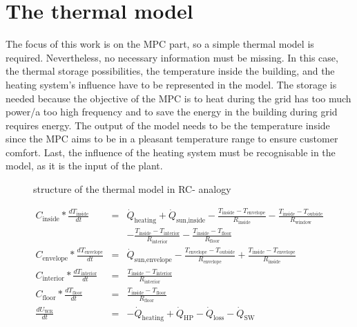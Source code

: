 \section{The thermal model}
\label{thermalmodel}

    The focus of this work is on the MPC part, so a simple thermal model is required. Nevertheless, no necessary information must be missing. In this case, the thermal storage possibilities, the temperature inside the building, and the heating system's influence have to be represented in the model. The storage is needed because the objective of the MPC is to heat during the grid has too much power/a too high frequency and to save the energy in the building during grid requires energy. The output of the model needs to be the temperature inside since the MPC aims to be in a pleasant temperature range to ensure customer comfort. Last, the influence of the heating system must be recognisable in the model, as it is the input of the plant. 
    \newline
    \begin{figure}
        \centering
        \def\svgwidth{320pt}
        
        \caption{structure of the thermal model in RC- analogy}
        \label{fig:structureThermalModel}
    \end{figure}
    
    \begin{align}
       \label{eq:meinModel2} 
       C_\text{inside}*\frac{d T_\text{inside}}{d t} &=& \dot{Q}_\text{heating} + \dot{Q}_\text{sun,inside} - \frac{T_\text{inside}-T_\text{envelope}}{R_\text{inside}} - \frac{T_\text{inside}-T_\text{outside}}{R_\text{window}} \\
       & &-\frac{T_\text{inside}-T_\text{interior}}{R_\text{interior}}-\frac{T_\text{inside}-T_\text{floor}}{R_\text{floor}} \nonumber\\
       C_\text{envelope}*\frac{d T_\text{envelope}}{d t} &=& \dot{Q}_\text{sun,envelope} - \frac{T_\text{envelope}-T_\text{outside}}{R_\text{envelope}} + \frac{T_\text{inside}-T_\text{envelope}}{R_\text{inside}} \nonumber \\
       C_\text{interior}*\frac{d T_\text{interior}}{d t} &=& \frac{T_\text{inside}-T_\text{interior}}{R_\text{interior}} \nonumber\\
       C_\text{floor}*\frac{d T_\text{floor}}{d t} &=& \frac{T_\text{inside}-T_\text{floor}}{R_\text{floor}} \nonumber\\
       \frac{d U_\text{WR}}{d t}&=& -\dot{Q}_\text{heating} + \dot{Q}_\text{HP} - \dot{Q}_\text{loss} - \dot{Q}_\text{SW} \nonumber
    \end{align}

